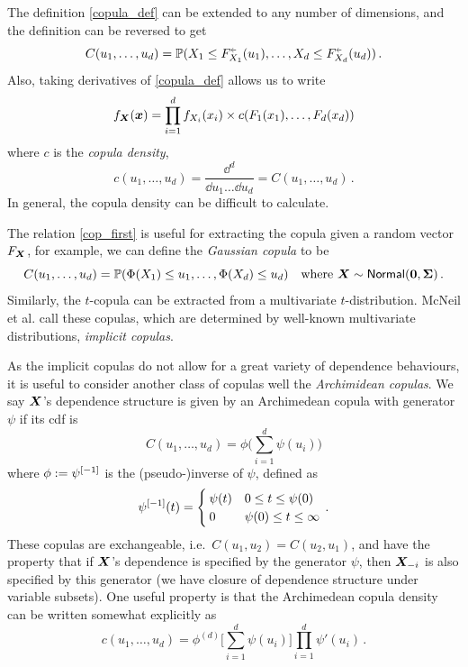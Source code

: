 The definition \eqref{copula_def} can be extended to any number of dimensions, and the definition can be reversed to get
\begin{equation} \label{cop_first}
C(u_1, \dots, u_d) = \Prob(X_1\le F_{X_1}^{{\ginv}}(u_1), \dots, X_d \le F_{X_d}^{\ginv}(u_d))  \,.
\end{equation}
Also, taking derivatives of \eqref{copula_def} allows us to write
\[ f_{\bm{X}}(\bm{x}) = \prod_{i=1}^d f_{X_i}(x_i) \times c(F_1(x_1), \dots, F_d(x_d)) \]
where $c$ is the \emph{copula density},
\[ c(u_1, \dots, u_d) = \frac{\dd^d}{\dd u_1 \dots \dd u_d} = C(u_1, \dots, u_d) \,. \]
In general, the copula density can be difficult to calculate.

The relation \eqref{cop_first} is useful for extracting the copula given a random vector $F_{\bm{X}}$, for example, we can define the \emph{Gaussian copula} to be
\[ C(u_1, \dots, u_d) = \operatorname{{\mathbb P}}(\Phi(X_1) \le u_1, \dots, \Phi(X_d) \le u_d) \quad \text{where } \bm{X} \sim \mathsf{Normal}(\bm{0}, \bm{\Sigma}) \,. \]
Similarly, the $t$-copula can be extracted from a multivariate $t$-distribution. McNeil et al. \cite{mcneil2015quantitative} call these copulas, which are determined by well-known multivariate distributions, \emph{implicit copulas}.

As the implicit copulas do not allow for a great variety of dependence behaviours, it is useful to consider another class of copulas well the \emph{Archimidean copulas}. We say $\bm{X}$'s dependence structure is given by an Archimedean copula with generator $\psi$ if its cdf is
\begin{equation*}
C(u_1, \dots, u_d) = \phi\bigl( \sum_{i=1}^d \psi(u_i) \bigr)
\end{equation*}
where $\phi := \psi^{[-1]}$ is the (pseudo-)inverse of $\psi$, defined as
\[ \psi^{[-1]}(t) = \begin{cases}
\psi(t) & 0 \le t \le \psi(0) \\
0 & \psi(0) \le t \le \infty
\end{cases} \,. \]
These copulas are exchangeable, i.e.\ $C(u_1, u_2) = C(u_2, u_1)$, and have the property that if $\bm{X}$'s dependence is specified by the generator $\psi$,  then $\bm{X}_{-i}$ is also specified by this generator (we have closure of dependence structure under variable subsets). One useful property is that the Archimedean copula density can be written somewhat explicitly as
\[ c(u_1, \dots, u_d) = \phi^{(d)}\bigl[ \sum_{i=1}^d \psi(u_i) \bigr] \prod_{i=1}^d \psi'(u_i) \,. \]

